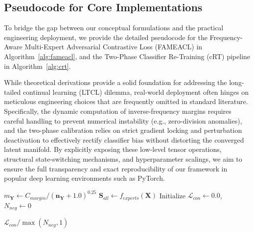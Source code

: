 \documentclass[journal]{IEEEtran}
\theoremstyle{plain}
\theoremstyle{definition}
\theoremstyle{remark}
\begin{document}
\subsection{Pseudocode for Core Implementations}
To bridge the gap between our conceptual formulations and the practical engineering deployment, we provide the detailed pseudocode for the Frequency-Aware Multi-Expert Adversarial Contrastive Loss (FAMEACL) in Algorithm~\ref{alg:fameacl}, and the Two-Phase Classifier Re-Training (cRT) pipeline in Algorithm~\ref{alg:crt}. 

While theoretical derivations provide a solid foundation for addressing the long-tailed continual learning (LTCL) dilemma, real-world deployment often hinges on meticulous engineering choices that are frequently omitted in standard literature. Specifically, the dynamic computation of inverse-frequency margins requires careful handling to prevent numerical instability (e.g., zero-division anomalies), and the two-phase calibration relies on strict gradient locking and perturbation deactivation to effectively rectify classifier bias without distorting the converged latent manifold. By explicitly exposing these low-level tensor operations, structural state-switching mechanisms, and hyperparameter scalings, we aim to ensure the full transparency and exact reproducibility of our framework in popular deep learning environments such as PyTorch.


\begin{algorithm2e}[t]
\caption{PyTorch-style Implementation of FAMEACL}
\label{alg:fameacl}
\SetAlgoLined
{}
$m_{\mathbf{Y}} \leftarrow C_{margin} / (\mathbf{n}_{\mathbf{Y}} + 1.0)^{0.25}$\;
$\mathbf{S}_{all} \leftarrow f_{experts}(\mathbf{X})$ 
Initialize $\mathcal{L}_{con} \leftarrow 0.0$, $N_{neg} \leftarrow 0$\;

\Return $\mathcal{L}_{con} / \max(N_{neg}, 1)$\;
\end{algorithm2e}
\end{document}
